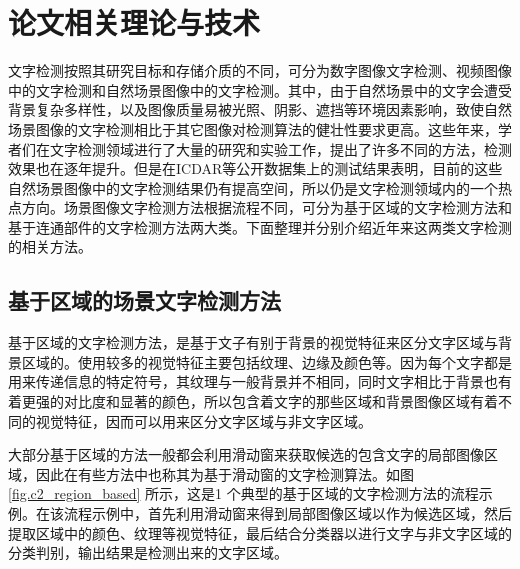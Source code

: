 ﻿%
%
%
%
%
%

\chapter{论文相关理论与技术}

    文字检测按照其研究目标和存储介质的不同，可分为数字图像文字检测、视频图像中的文字检测和自然场景图像中的文字检测。其中，由于自然场景中的文字会遭受背景复杂多样性，以及图像质量易被光照、阴影、遮挡等环境因素影响，致使自然场景图像的文字检测相比于其它图像对检测算法的健壮性要求更高。这些年来，学者们在文字检测领域进行了大量的研究和实验工作，提出了许多不同的方法，检测效果也在逐年提升。但是在ICDAR等公开数据集上的测试结果表明，目前的这些自然场景图像中的文字检测结果仍有提高空间，所以仍是文字检测领域内的一个热点方向。场景图像文字检测方法根据流程不同，可分为基于区域的文字检测方法和基于连通部件的文字检测方法两大类。下面整理并分别介绍近年来这两类文字检测的相关方法。

    \section{基于区域的场景文字检测方法}

    基于区域的文字检测方法，是基于文子有别于背景的视觉特征来区分文字区域与背景区域的。使用较多的视觉特征主要包括纹理、边缘及颜色等。因为每个文字都是用来传递信息的特定符号，其纹理与一般背景并不相同，同时文字相比于背景也有着更强的对比度和显著的颜色，所以包含着文字的那些区域和背景图像区域有着不同的视觉特征，因而可以用来区分文字区域与非文字区域。

    大部分基于区域的方法一般都会利用滑动窗来获取候选的包含文字的局部图像区域，因此在有些方法中也称其为基于滑动窗的文字检测算法。如图\ref{fig.c2_region_based} 所示，这是1 个典型的基于区域的文字检测方法的流程示例。在该流程示例中，首先利用滑动窗来得到局部图像区域以作为候选区域，然后提取区域中的颜色、纹理等视觉特征，最后结合分类器以进行文字与非文字区域的分类判别，输出结果是检测出来的文字区域。

